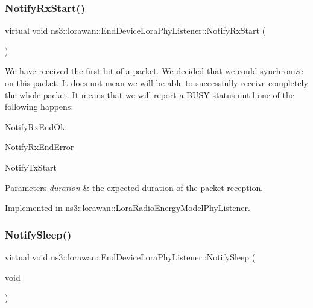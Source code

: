 \subsubsection{\texorpdfstring{Notify\+Rx\+Start()}{NotifyRxStart()}}
{\footnotesize\ttfamily virtual void ns3\+::lorawan\+::\+End\+Device\+Lora\+Phy\+Listener\+::\+Notify\+Rx\+Start (\begin{DoxyParamCaption}{ }\end{DoxyParamCaption})\hspace{0.3cm}{\ttfamily [pure virtual]}}

We have received the first bit of a packet. We decided that we could synchronize on this packet. It does not mean we will be able to successfully receive completely the whole packet. It means that we will report a B\+U\+SY status until one of the following happens\+:
\begin{DoxyItemize}
\item Notify\+Rx\+End\+Ok
\item Notify\+Rx\+End\+Error
\item Notify\+Tx\+Start
\end{DoxyItemize}


\begin{DoxyParams}{Parameters}
{\em duration} & the expected duration of the packet reception. \\
\hline
\end{DoxyParams}


Implemented in \hyperlink{classns3_1_1lorawan_1_1LoraRadioEnergyModelPhyListener_a34bb7b2aae72cd8634672bd460247edb}{ns3\+::lorawan\+::\+Lora\+Radio\+Energy\+Model\+Phy\+Listener}.

\mbox{\label{classns3_1_1lorawan_1_1EndDeviceLoraPhyListener_a0e9d774b67cbddee98c5f7d76c844c65}} 
\subsubsection{\texorpdfstring{Notify\+Sleep()}{NotifySleep()}}
{\footnotesize\ttfamily virtual void ns3\+::lorawan\+::\+End\+Device\+Lora\+Phy\+Listener\+::\+Notify\+Sleep (\begin{DoxyParamCaption}\item[{void}]{ }\end{DoxyParamCaption})\hspace{0.3cm}{\ttfamily [pure virtual]}}

